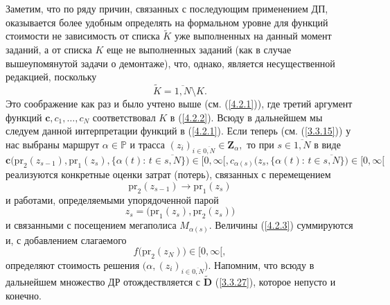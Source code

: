 \documentclass[11pt,twoside,openany]{report}
\newcommand{\bfn}{\begin{equation}}
\newcommand{\efn}{\end{equation}}
\newcommand{\ov}{\overline}
\newcommand{\al}{\alpha}
\newcommand{\sm}{\setminus}
\newcommand{\bbp}{{\mathbb P}}
\begin{document}
{Заметим, что по ряду причин, связанных с последующим применением ДП,
оказывается более  удобным определять на формальном уровне для функций
стоимости не зависимость от списка $\widetilde{K}$ уже выполненных на
данный момент заданий, а от списка $K$ еще не выполненных заданий (как
в случае вышеупомянутой задачи о демонтаже), что, однако, является
несущественной редакцией, поскольку
\bfn\label{4.2.2}
\widetilde{K} = \ov{1,N}\sm K.
\efn
Это соображение как раз и было учтено выше (см. (\ref{4.2.1})), где третий
аргумент функций $\mathbf{c},c_1,\ldots,c_N$ соответствовал $K$ в (\ref{4.2.2}).
Всюду в дальнейшем мы следуем данной интерпретации функций в (\ref{4.2.1}).
Если теперь (см. (\ref{3.3.15}))
у нас выбраны маршрут $\al\in \bbp$ и трасса $(z_i)_{i\in\ov{0,N}}\in
\mathbf{Z}_\al,$ то при $s\in \ov{1,N}$
в виде
\bfn\label{4.2.3}
\mathbf{c}\bigl(\mathrm{pr}_2(z_{s-1}),\mathrm{pr}_1(z_s),\{\al(t):\,t\in \ov{s,N}\}\bigl)
\in [0,\infty[, c_{\al(s)}\bigl(z_s, \{\al(t):\,t\in \ov{s,N}\}\bigl)\in [0,\infty[
\efn
реализуются конкретные  оценки затрат (потерь), связанных с перемещением
$$ \mathrm{pr}_2(z_{s-1}) \longrightarrow \mathrm{pr}_1(z_s)
$$
и работами, определяемыми упорядоченной парой
$$z_s = \bigl(\mathrm{pr}_1(z_s),\mathrm{pr}_2(z_s)\bigl)$$
и связанными с посещением мегаполиса $M_{\al(s)}.$ Величины (\ref{4.2.3})
суммируются  и, с добавлением
слагаемого
$$
f\bigl(\mathrm{pr}_2(z_N)\bigl)\in [0,\infty[,
$$
определяют стоимость решения $\bigl(\al,(z_i)_{i\in\ov{0,N}}\bigl).$
Напомним, что всюду в дальнейшем множество ДР отождествляется с
$\widetilde{\mathbf{D}}$ (\ref{3.3.27}), которое непусто и конечно.

}
\end{document}
